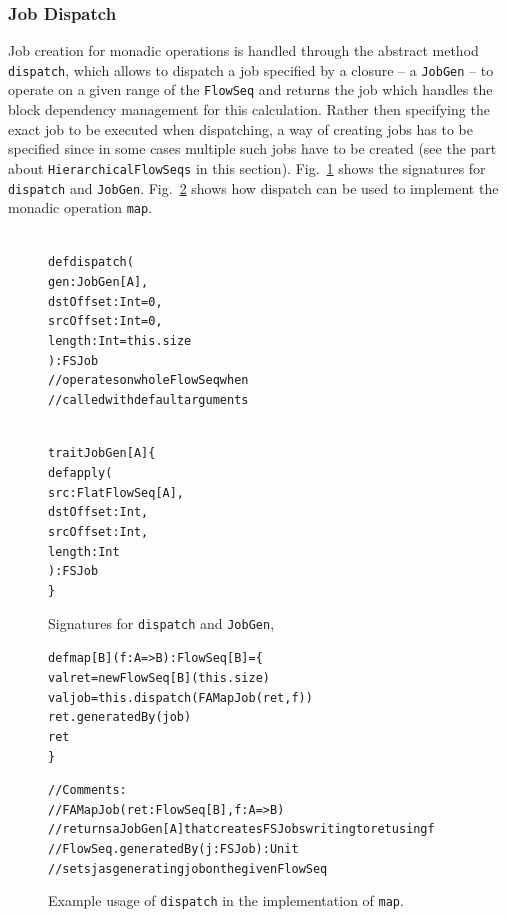 \documentclass[runningheads,a4paper,fleqn]{llncs}
\begin{document}
\subsubsection{Job Dispatch}
Job creation for monadic operations is handled through the abstract
method \texttt{dispatch}, which allows to dispatch a job specified by
a closure -- a \texttt{JobGen} -- to operate on a given range of the
\texttt{FlowSeq} and returns the job which handles the block dependency
management for this calculation. Rather then specifying the exact job
to be executed when dispatching, a way of creating jobs has to be 
specified since in some cases multiple such jobs have to be created
(see the part about \texttt{HierarchicalFlowSeqs} in this
section). Fig.~\ref{fig:dispatch-code} shows the 
signatures for \texttt{dispatch} and
\texttt{JobGen}. Fig.~\ref{fig:dispatch-example} shows how dispatch
can be used to implement the monadic operation \texttt{map}.

\begin{figure}
\begin{minipage}[t]{6cm}
\begin{alltt}
{\scriptsize
def dispatch(
  gen: JobGen[A],
  dstOffset: Int = 0,
  srcOffset: Int = 0,
  length: Int = this.size
): FSJob
// operates on whole FlowSeq when
// called with default arguments
}
\end{alltt}
\end{minipage}
\begin{minipage}[t]{6cm}
\begin{alltt}
{\scriptsize
trait JobGen[A] \{
  def apply(
    src: FlatFlowSeq[A],
    dstOffset: Int,
    srcOffset: Int,
    length: Int
  ): FSJob
\}
}
\end{alltt}
\end{minipage}
\caption{Signatures for \texttt{dispatch} and \texttt{JobGen}, }
\label{fig:dispatch-code}
\end{figure}

\begin{figure}
\begin{alltt}
{\scriptsize
def map[B](f: A => B): FlowSeq[B] = \{
    val ret = newFlowSeq[B](this.size)
    val job = this.dispatch(FAMapJob(ret, f))
    ret.generatedBy(job)
    ret
\}

// Comments:
//  FAMapJob(ret: FlowSeq[B], f: A => B)
//    returns a JobGen[A] that creates FSJobs writing to ret using f
//  FlowSeq.generatedBy(j: FSJob): Unit
//    sets j as generating job on the given FlowSeq
}
\end{alltt}
\caption{Example usage of \texttt{dispatch} in the implementation of
  \texttt{map}.}
\label{fig:dispatch-example}
\end{figure}
\end{document}
